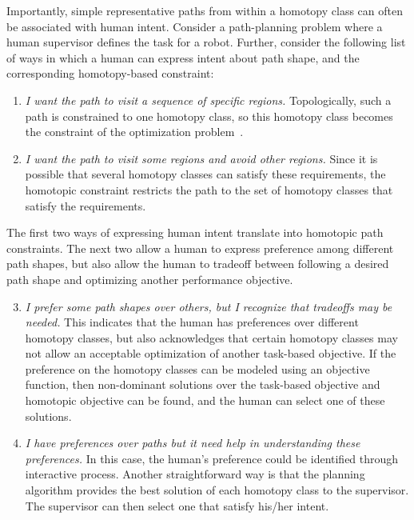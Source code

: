 \documentclass[letterpaper, 10 pt, conference]{ieeeconf}
\begin{document}
Importantly, simple representative paths from within a homotopy class can often be associated with human intent.
Consider a path-planning problem where a human supervisor defines the task for a robot.  Further, consider the following list of ways in which a human can express intent about path shape, and the corresponding homotopy-based constraint:
\begin{enumerate}
\item \emph{I want the path to visit a sequence of specific regions.}
Topologically, such a path is constrained to one homotopy class, so this homotopy class becomes the constraint of the optimization problem~\cite{Hershberger199463}.
\item \emph{I want the path to visit some regions and avoid other regions.}
Since it is possible that several homotopy classes can satisfy these requirements, the homotopic constraint restricts the path to  the set of homotopy classes that satisfy the requirements.
\end{enumerate}
The first two ways of expressing human intent translate into homotopic path constraints.  The next two allow a human to express preference among different path shapes, but also allow the human to tradeoff between following a desired path shape and optimizing another performance objective.
\begin{enumerate}
\setcounter{enumi}{2}
\item \emph{I prefer some path shapes over others, but I recognize that tradeoffs may be needed.} 
This indicates that the human has preferences over different homotopy classes, but also acknowledges that certain homotopy classes may not allow an acceptable optimization of another task-based objective.
If the preference on the homotopy classes can be modeled using an objective function, then non-dominant solutions over the task-based objective and homotopic objective can be found, and the human can select one of these solutions.
\item \emph{I have preferences over paths but it need help in understanding these preferences.}
In this case, the human's preference could be identified through interactive process.
Another straightforward way is that the planning algorithm provides the best solution of each homotopy class to the supervisor.
The supervisor can then select one that satisfy his/her intent.
\end{enumerate}
\end{document}
